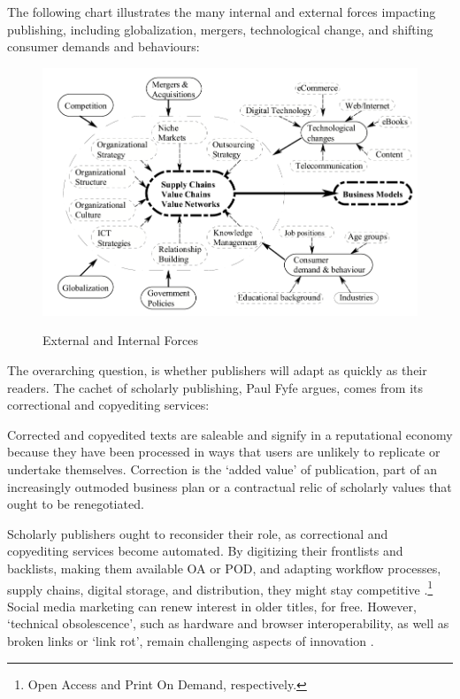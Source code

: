 \documentclass[12pt,a4paper]{scrartcl}
\begin{document}
The following chart illustrates the many internal and external forces impacting publishing, including globalization, mergers, technological change, and shifting consumer demands and behaviours:

{}
\begin{figure}[H]
\includegraphics[scale=0.5]{internal}
\centering
\caption{External and Internal Forces}\protect\autocite[18]{martin}
\label{Fig.1}
\centering
\end{figure}

The overarching question, is whether publishers will adapt as quickly as their readers. The cachet of scholarly publishing, Paul Fyfe argues, comes from its correctional and copyediting services:

\begin{displayquote}
Corrected and copyedited texts are saleable and signify in a reputational economy because they have been processed in ways that users are unlikely to replicate or undertake themselves. Correction is the `added value' of publication, part of an increasingly outmoded business plan or a contractual relic of scholarly values that ought to be renegotiated. \autocite[265]{fyfe}
\end{displayquote}

Scholarly publishers ought to reconsider their role, as correctional and copyediting services become automated. By digitizing their frontlists and backlists, making them available OA or POD, and adapting workflow processes, supply chains, digital storage, and distribution, they might stay competitive \autocite[39]{martin}.\footnote{Open Access and Print On Demand, respectively.} Social media marketing can renew interest in older titles, for free. However, `technical obsolescence', such as hardware and browser interoperability, as well as broken links or `link rot', remain challenging aspects of innovation \parencite[260]{fyfe}. 
 
\end{document}

